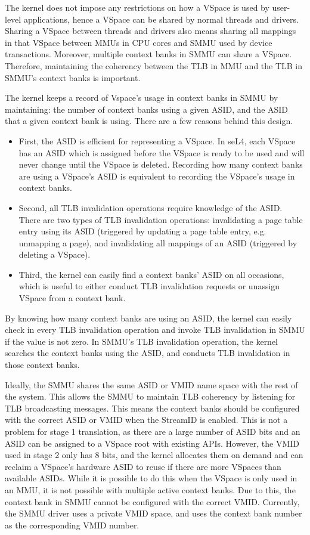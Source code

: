 The kernel does not impose any restrictions on how a VSpace is used by user-level
applications, hence a VSpace can be shared by normal threads and drivers. Sharing
a VSpace between threads and drivers also means sharing all mappings in that
VSpace between MMUs in CPU cores and SMMU used by device transactions. Moreover,
multiple context banks in SMMU can share a VSpace. Therefore, maintaining the
coherency between the TLB in MMU and the TLB in SMMU's context banks is important.

The kernel keeps a record of Vspace's usage in context banks in SMMU by
maintaining: the number of context banks using a given ASID, and the ASID that a
given context bank is using. There are a few reasons behind this design.
\begin{itemize}
\item First, the ASID is efficient for representing a VSpace. In seL4, each VSpace has
an ASID which is assigned before the VSpace is ready to be used and will never
change until the VSpace is deleted. Recording how many context banks are using a
VSpace's ASID is equivalent to recording the VSpace's usage in context banks.
\item Second, all TLB invalidation operations require knowledge of the ASID. There are
two types of TLB invalidation operations: invalidating a page table entry using
its ASID (triggered by updating a page table entry, e.g. unmapping a page), and
invalidating all mappings of an ASID (triggered by deleting a VSpace).
\item Third, the kernel can easily find a context banks' ASID on all occasions, which is
useful to either conduct TLB invalidation requests or unassign VSpace from a
context bank.
\end{itemize}

By knowing how many context banks are using an ASID, the kernel can easily check
in every TLB invalidation operation and invoke TLB invalidation in SMMU if the
value is not zero. In SMMU's TLB invalidation operation, the kernel searches the
context banks using the ASID, and conducts TLB invalidation in those context banks.

Ideally, the SMMU shares the same ASID or VMID name space with the rest of the
system. This allows the SMMU to maintain TLB coherency by listening for TLB
broadcasting messages. This means the context banks should be configured with
the correct ASID or VMID when the StreamID is enabled. This is not a problem for
stage 1 translation, as there are a large number of ASID bits and an ASID can be
assigned to a VSpace root with existing APIs. However, the VMID used in stage 2
only has 8 bits, and the kernel allocates them on demand and can reclaim a
VSpace's hardware ASID to reuse if there are more VSpaces than available ASIDs.
While it is possible to do this when the VSpace is only used in an MMU, it is
not possible with multiple active context banks.
Due to this, the context bank in SMMU cannot be configured with the correct VMID.
Currently, the SMMU driver uses a private VMID space, and uses the context bank
number as the corresponding VMID number.




